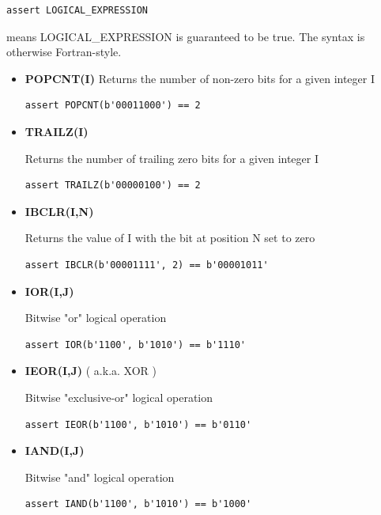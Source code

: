 \begin{lstlisting}
assert LOGICAL_EXPRESSION
\end{lstlisting}
means LOGICAL\_EXPRESSION is guaranteed to be true. The syntax is otherwise Fortran-style.
      
      

\begin{itemize}
	      
	\item \textbf{POPCNT(I)}       
	Returns the number of non-zero bits for a given integer I
	\begin{lstlisting}
assert POPCNT(b'00011000') == 2
	\end{lstlisting}
	
	      
	\item \textbf{TRAILZ(I)}
	            
	Returns the number of trailing zero bits for a given integer I
	\begin{lstlisting}
assert TRAILZ(b'00000100') == 2
	\end{lstlisting}
	      
	      
	\item \textbf{IBCLR(I,N)}
	            
	      Returns the value of I with the bit at position N set to zero
	\begin{lstlisting}
assert IBCLR(b'00001111', 2) == b'00001011'
	\end{lstlisting}
	      
	     
   	\item \textbf{IOR(I,J)}
	            
	      Bitwise "or" logical operation
	\begin{lstlisting}
assert IOR(b'1100', b'1010') == b'1110'
	\end{lstlisting}

	 
	\item \textbf{IEOR(I,J)} ( a.k.a. XOR )
	            
	      Bitwise "exclusive-or" logical operation
	\begin{lstlisting}
assert IEOR(b'1100', b'1010') == b'0110'
	\end{lstlisting}
	      
	      
	\item \textbf{IAND(I,J)}
	            
	      Bitwise "and" logical operation
	\begin{lstlisting}
assert IAND(b'1100', b'1010') == b'1000'
	\end{lstlisting}
	      

\end{itemize}
